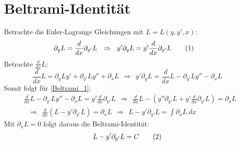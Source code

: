 \documentclass[a4paper,12pt]{article}
\newcommand\numberthis{\addtocounter{equation}{1}\tag{\theequation}}
\begin{document}
\section*{Beltrami-Identität}
Betrachte die Euler-Lagrange Gleichungen mit $L=L(y, y', x)$:
\begin{align*}
\partial_{y}L&=\frac{d}{dx}\partial_{y'}L\ \ \Rightarrow\ \ y'\partial_{y}L=y'\frac{d}{dx}\partial_{y'}L \numberthis\label{Beltrami_1}
\end{align*}
Betrachte $\frac{d}{dx}L$:
$$\frac{d}{dx}L=\partial_yLy'+\partial_{y'}Ly''+\partial_xL\ \ \Rightarrow\ \ y'\partial_yL=\frac{d}{dx}L-\partial_{y'}Ly''-\partial_xL$$
Somit folgt für \ref{Beltrami_1}:
\begin{align*}
&\frac{d}{dx}L-\partial_{y'}Ly''-\partial_xL=y'\frac{d}{dx}\partial_{y'}L\ \ \Rightarrow\ \ \frac{d}{dx}L-\left(y''\partial_{y'}L+y'\frac{d}{dx}\partial_{y'}L\right)=\partial_xL\\
&\ \ \ \Rightarrow\ \ \frac{d}{dx}\left(L-y'\partial_{y'}L\right)=\partial_xL\ \ \Rightarrow\ \ L-y'\partial_{y'}L=\int \partial_xL\ dx
\end{align*}
Mit $\partial_xL=0$ folgt daraus die Beltrami-Identität:
\begin{align*}
L-y'\partial_{y'}L=C \numberthis\label{Beltrami_result}
\end{align*}
\end{document}
